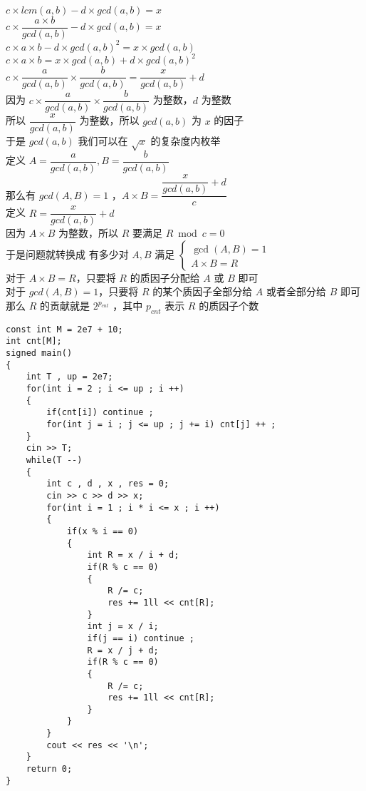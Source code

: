 \documentclass[E:/GsjzTle/main/main.tex]{subfiles}
\begin{document}
\(c\times lcm(a,b) - d\times gcd(a , b) = x\)\\
\(c\times \dfrac{a \times b}{gcd(a,b)} - d\times gcd(a , b) = x\)\\
\(c \times a\times b - d\times gcd(a , b)^2 = x \times gcd(a,b)\)\\
\(c \times a\times b = x \times gcd(a,b) + d\times gcd(a , b)^2\)\\
\(c \times \dfrac{a}{gcd(a,b)}\times \dfrac{b}{gcd(a,b)} = \dfrac{x}{gcd(a,b)} + d\)\\
因为 \(c \times \dfrac{a}{gcd(a,b)}\times \dfrac{b}{gcd(a,b)}\)
为整数，\(d\) 为整数\\
所以 \(\dfrac{x}{gcd(a,b)}\) 为整数，所以 \(gcd(a,b)\) 为 \(x\) 的因子\\
于是 \(gcd(a,b)\) 我们可以在 \(\sqrt{x}\) 的复杂度内枚举\\
定义 \(A = \dfrac{a}{gcd(a,b)} , B = \dfrac{b}{gcd(a,b)}\)\\
那么有 \(gcd(A , B) =1\)
，\(A \times B = \dfrac{\dfrac{x}{gcd(a,b)} + d}{c}\)\\
定义 \(R =  {\dfrac{x}{gcd(a,b)} + d}\)\\
因为 \(A \times B\) 为整数，所以 \(R\) 要满足 \(R\bmod c = 0\)\\
于是问题就转换成 有多少对 \(A,B\) 满足
\(\begin{cases}\gcd \left( A,B\right) =1\\
A\times B=R\end{cases}\)\\
对于 \(A \times B= R\)，只要将 \(R\) 的质因子分配给 \(A\) 或 \(B\) 即可
\\
对于 \(gcd(A , B) = 1\)，只要将 \(R\) 的某个质因子全部分给 \(A\)
或者全部分给 \(B\) 即可\\
那么 \(R\) 的贡献就是 \(2^{p_{cnt}}\) ，其中 \(p_{cnt}\) 表示 \(R\)
的质因子个数

\begin{lstlisting}
const int M = 2e7 + 10;
int cnt[M];
signed main()
{
	int T , up = 2e7;
	for(int i = 2 ; i <= up ; i ++)
	{
		if(cnt[i]) continue ;
		for(int j = i ; j <= up ; j += i) cnt[j] ++ ;
	}
	cin >> T;
	while(T --)
	{
		int c , d , x , res = 0;	
		cin >> c >> d >> x;
		for(int i = 1 ; i * i <= x ; i ++)
		{
			if(x % i == 0)
			{
				int R = x / i + d;
				if(R % c == 0)
				{
					R /= c;
					res += 1ll << cnt[R];	
				} 	
				int j = x / i;			
				if(j == i) continue ;			
				R = x / j + d;			
				if(R % c == 0)
				{
					R /= c;			
					res += 1ll << cnt[R];
				}
			}
		}	
		cout << res << '\n';
	}
	return 0;
}
\end{lstlisting}
\end{document}

